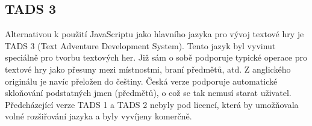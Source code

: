 \documentclass[main.tex]{subfiles}
\begin{document}
\subsection{TADS 3}
\label{tads}
Alternativou k použití JavaScriptu jako hlavního jazyka pro vývoj textové hry je TADS 3 (Text Adventure Development System). Tento jazyk byl vyvinut speciálně pro tvorbu textových her. Již sám o sobě podporuje typické operace pro textové hry jako přesuny mezi místnostmi, braní předmětů, atd. Z anglického originálu je navíc přeložen do češtiny. Česká verze podporuje automatické skloňování podstatných jmen (předmětů), o což se tak nemusí starat uživatel. Předcházející verze TADS 1 a TADS 2 nebyly pod licencí, která by umožňovala volné rozšiřování jazyka a byly vyvíjeny komerčně. \cite{web:wik:en:tads, web:tads}
\end{document}
